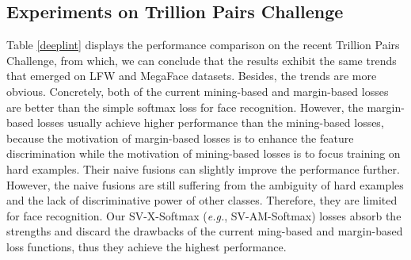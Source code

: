 \documentclass[10pt,twocolumn,letterpaper]{article}
\begin{document}
\begin{table}
\begin{center}
\end{center}		
\caption{Performance (\%) of different loss functions on Trillion Pairs Challenge. }
\label{deeplint}
\end{table}

\subsection{Experiments on Trillion Pairs Challenge}
Table \ref{deeplint} displays the performance comparison on the recent Trillion Pairs Challenge, from which, we can conclude that the results exhibit the same trends that emerged on LFW and MegaFace datasets. Besides, the trends are more obvious. Concretely, both of the current mining-based and margin-based losses are better than the simple softmax loss for face recognition. However, the margin-based losses usually achieve higher performance than the mining-based losses, because the motivation of margin-based losses is to enhance the feature discrimination while the motivation of mining-based losses is to focus training on hard examples. Their naive fusions can slightly improve the performance further. However, the naive fusions are still suffering from the ambiguity of hard examples and the lack of discriminative power of other classes. Therefore, they are limited for face recognition. Our SV-X-Softmax (\textit{e.g.}, SV-AM-Softmax) losses absorb the strengths and discard the drawbacks of the current ming-based and margin-based loss functions, thus they achieve the highest performance.
\end{document}
